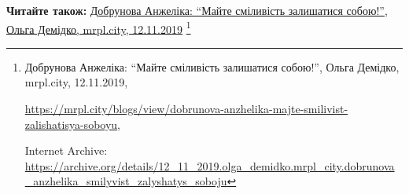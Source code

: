  
 
 
 
 

\def\pubIA{https://archive.org/details/12_11_2019.olga_demidko.mrpl_city.dobrunova_anzhelika_smilyvist_zalyshatys_soboju}
\def\pubTitle{Добрунова Анжеліка: \enquote{Майте сміливість залишатися собою!}}
\def\pubDate{12.11.2019}
\def\pubOrigin{https://mrpl.city/blogs/view/dobrunova-anzhelika-majte-smilivist-zalishatisya-soboyu}
\def\pubAuthor{Ольга Демідко}

\textbf{Читайте також:} \href{\pubIA}{%
\pubTitle, \pubAuthor, mrpl.city, \pubDate}%
\footnote{\pubTitle, \pubAuthor, mrpl.city, \pubDate, \par\url{\pubOrigin}, \par Internet Archive: \url{\pubIA}}
